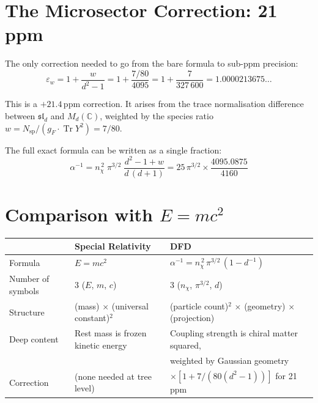 \documentclass[11pt]{article}
\newcommand{\Tr}{\operatorname{Tr}}
\newcommand{\nchi}{n_{\!\chi}}
\begin{document}
\section{The Microsector Correction: 21\,ppm}
\label{sec:microsector}

The only correction needed to go from the bare formula to sub-ppm precision:
\begin{equation}
\varepsilon_w = 1 + \frac{w}{d^2 - 1}
= 1 + \frac{7/80}{4095}
= 1 + \frac{7}{327\,600}
= 1.0000213675\ldots
\label{eq:microsector}
\end{equation}

This is a $+21.4$\,ppm correction.  It arises from the trace normalisation
difference between $\mathfrak{sl}_d$ and $M_d(\mathbb{C})$, weighted by
the species ratio $w = N_{\mathrm{sp}}/(g_F \cdot \Tr Y^2) = 7/80$.

The full exact formula can be written as a single fraction:
\begin{equation}
\alpha^{-1}
= \nchi^{\,2}\;\pi^{3/2}\;
\frac{d^2 - 1 + w}{d\,(d+1)}
= 25\,\pi^{3/2} \times \frac{4095.0875}{4160}
\label{eq:single-fraction}
\end{equation}


\section{Comparison with $E = mc^2$}
\label{sec:comparison}

\begin{center}
\renewcommand{\arraystretch}{1.4}
\begin{tabular}{@{}p{3cm}p{5.5cm}p{5.5cm}@{}}
\toprule
& \textbf{Special Relativity} & \textbf{DFD} \\
\midrule
Formula
& $E = mc^2$
& $\alpha^{-1} = \nchi^{\,2}\,\pi^{3/2}\,(1 - d^{-1})$ \\[3pt]
Number of symbols
& 3 ($E$, $m$, $c$)
& 3 ($\nchi$, $\pi^{3/2}$, $d$) \\[3pt]
Structure
& (mass) $\times$ (universal constant)$^2$
& (particle count)$^2$ $\times$ (geometry) $\times$ (projection) \\[3pt]
Deep content
& Rest mass is frozen kinetic energy
& Coupling strength is chiral matter squared,\\
& & weighted by Gaussian geometry \\[3pt]
Correction
& (none needed at tree level)
& $\times [1 + 7/(80(d^2{-}1))]$ for 21\,ppm \\
\bottomrule
\end{tabular}
\end{center}
\end{document}
